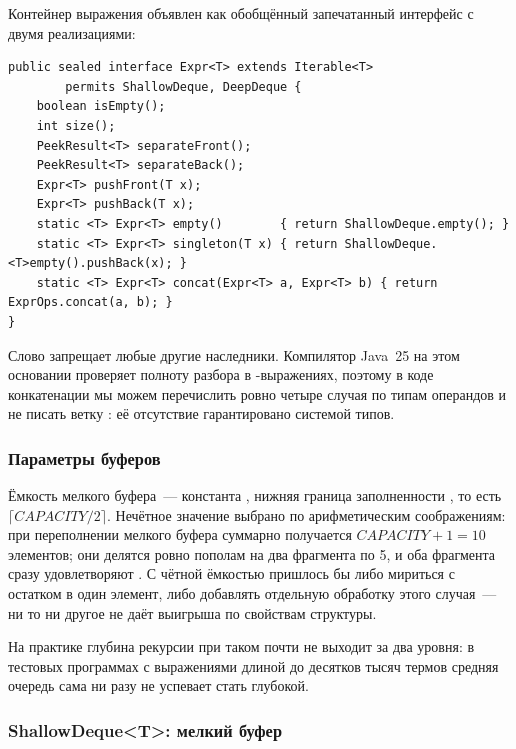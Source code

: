 Контейнер выражения объявлен как обобщённый запечатанный интерфейс с двумя
реализациями:

\begin{longlisting}
\caption{Запечатанный интерфейс Expr<T>}\label{lst:expr-iface}
\begin{verbatim}
public sealed interface Expr<T> extends Iterable<T>
        permits ShallowDeque, DeepDeque {
    boolean isEmpty();
    int size();
    PeekResult<T> separateFront();
    PeekResult<T> separateBack();
    Expr<T> pushFront(T x);
    Expr<T> pushBack(T x);
    static <T> Expr<T> empty()        { return ShallowDeque.empty(); }
    static <T> Expr<T> singleton(T x) { return ShallowDeque.<T>empty().pushBack(x); }
    static <T> Expr<T> concat(Expr<T> a, Expr<T> b) { return ExprOps.concat(a, b); }
}
\end{verbatim}
\end{longlisting}

Слово  запрещает любые другие наследники. Компилятор
Java~25 на этом основании проверяет полноту разбора в
-выражениях, поэтому в коде конкатенации мы можем
перечислить ровно четыре случая по типам операндов и не писать ветку
: её отсутствие гарантировано системой типов.

\subsubsection{Параметры буферов}

Ёмкость мелкого буфера~--- константа ,
нижняя граница заполненности , то есть
$\lceil CAPACITY / 2 \rceil$. Нечётное значение выбрано по
арифметическим соображениям: при переполнении мелкого буфера суммарно
получается $CAPACITY + 1 = 10$ элементов; они делятся ровно пополам
на два фрагмента по 5, и оба фрагмента сразу удовлетворяют
. С чётной ёмкостью пришлось бы либо мириться с
остатком в один элемент, либо добавлять отдельную обработку этого
случая~--- ни то ни другое не даёт выигрыша по свойствам структуры.

На практике глубина рекурсии  при таком 
почти не выходит за два уровня: в тестовых программах с выражениями
длиной до десятков тысяч термов средняя очередь сама ни разу не успевает
стать глубокой.

\subsubsection{ShallowDeque<T>: мелкий буфер}

